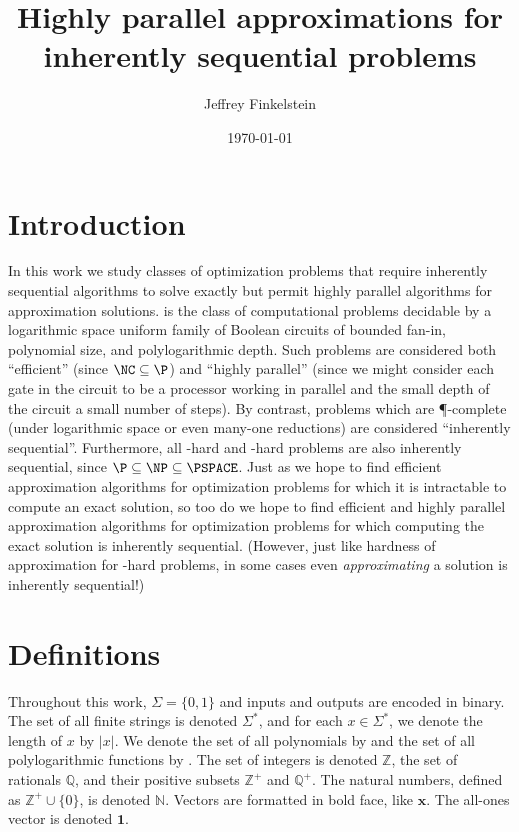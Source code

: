 \documentclass[]{article}
\author{Jef{}frey Finkelstein}
\date{\today}
\title{Highly parallel approximations for inherently sequential problems}
\begin{document}
\maketitle

\section{Introduction}

In this work we study classes of optimization problems that require inherently sequential algorithms to solve exactly but permit highly parallel algorithms for approximation solutions.
\NC{} is the class of computational problems decidable by a logarithmic space uniform family of Boolean circuits of bounded fan-in, polynomial size, and polylogarithmic depth.
Such problems are considered both ``efficient'' (since $\NC \subseteq \P$) and ``highly parallel'' (since we might consider each gate in the circuit to be a processor working in parallel and the small depth of the circuit a small number of steps).
By contrast, problems which are \P-complete (under logarithmic space or even \NC{} many-one reductions) are considered ``inherently sequential''.
Furthermore, all \NP-hard and \PSPACE-hard problems are also inherently sequential, since $\P \subseteq \NP \subseteq \PSPACE$.
Just as we hope to find efficient approximation algorithms for optimization problems for which it is intractable to compute an exact solution, so too do we hope to find efficient and highly parallel approximation algorithms for optimization problems for which computing the exact solution is inherently sequential.
(However, just like hardness of approximation for \NP-hard problems, in some cases even \emph{approximating} a solution is inherently sequential!)

\section{Definitions}

Throughout this work, $\Sigma=\{0, 1\}$ and inputs and outputs are encoded in binary.
The set of all finite strings is denoted $\Sigma^*$, and for each $x \in \Sigma^*$, we denote the length of $x$ by $|x|$.
We denote the set of all polynomials by \poly{} and the set of all polylogarithmic functions by \polylog.
The set of integers is denoted $\mathbb{Z}$, the set of rationals $\mathbb{Q}$, and their positive subsets $\mathbb{Z}^+$ and $\mathbb{Q}^+$.
The natural numbers, defined as $\mathbb{Z}^+ \cup \{0\}$, is denoted $\mathbb{N}$.
Vectors are formatted in bold face, like $\mathbf{x}$.
The all-ones vector is denoted $\mathbf{1}$.
\end{document}
